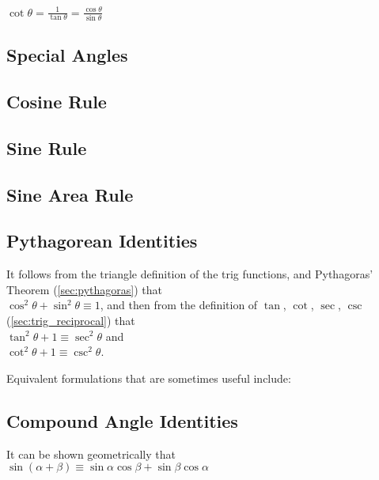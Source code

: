 \documentclass[a4paper,11pt]{article}
\begin{document}
    $\displaystyle\cot \theta = \frac{1}{\tan \theta}
        = \frac{\cos \theta}{\sin \theta}$

    \subsection{Special Angles}


    \subsection{Cosine Rule}

    \subsection{Sine Rule}

    \subsection{Sine Area Rule}

    \subsection{Pythagorean Identities} \label{sec:trig_pythag}

    It follows from the triangle definition of the trig functions, and
    Pythagoras' Theorem (\ref{sec:pythagoras}) that
    \\$\cos^2 \theta + \sin^2 \theta \equiv 1$, and then from the definition of
    $\tan$, $\cot$, $\sec$, $\csc$ (\ref{sec:trig_reciprocal}) that
    \\$\tan^2 \theta + 1 \equiv \sec^2 \theta$ and
    \\$\cot^2 \theta + 1 \equiv \csc^2 \theta$.

    Equivalent formulations that are sometimes useful include:


    \subsection{Compound Angle Identities} \label{sec:comp_angle}


    It can be shown geometrically that
    \\$\sin(\alpha + \beta) \equiv
       \sin \alpha \cos \beta +  \sin \beta \cos \alpha$
\end{document}
